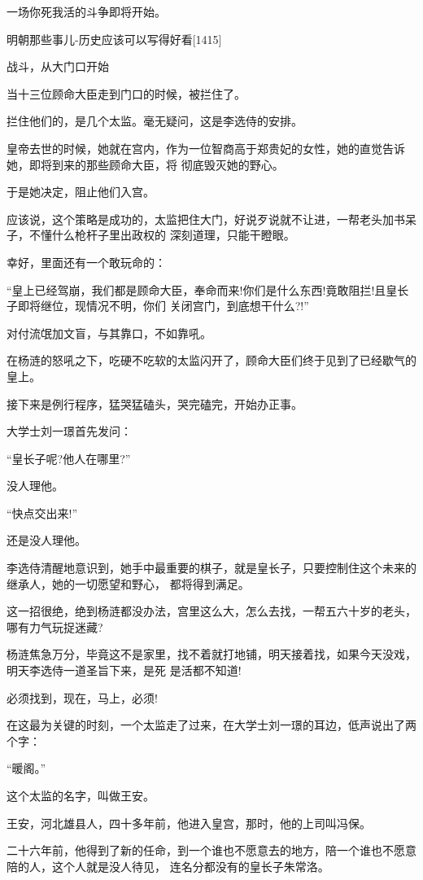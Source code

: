 \documentclass[11pt,a4paper,onecolumn]{article}
\begin{document}
一场你死我活的斗争即将开始。

明朝那些事儿-历史应该可以写得好看$[$1415$]$

战斗，从大门口开始

当十三位顾命大臣走到门口的时候，被拦住了。

拦住他们的，是几个太监。毫无疑问，这是李选侍的安排。

皇帝去世的时候，她就在宫内，作为一位智商高于郑贵妃的女性，她的直觉告诉她，即将到来的那些顾命大臣，将
彻底毁灭她的野心。

于是她决定，阻止他们入宫。

应该说，这个策略是成功的，太监把住大门，好说歹说就不让进，一帮老头加书呆子，不懂什么枪杆子里出政权的
深刻道理，只能干瞪眼。

幸好，里面还有一个敢玩命的：

``皇上已经驾崩，我们都是顾命大臣，奉命而来!你们是什么东西!竟敢阻拦!且皇长子即将继位，现情况不明，你们
关闭宫门，到底想干什么?!''

对付流氓加文盲，与其靠口，不如靠吼。

在杨涟的怒吼之下，吃硬不吃软的太监闪开了，顾命大臣们终于见到了已经歇气的皇上。

接下来是例行程序，猛哭猛磕头，哭完磕完，开始办正事。

大学士刘一璟首先发问：

``皇长子呢?他人在哪里?''

没人理他。

``快点交出来!''

还是没人理他。

李选侍清醒地意识到，她手中最重要的棋子，就是皇长子，只要控制住这个未来的继承人，她的一切愿望和野心，
都将得到满足。

这一招很绝，绝到杨涟都没办法，宫里这么大，怎么去找，一帮五六十岁的老头，哪有力气玩捉迷藏?

杨涟焦急万分，毕竟这不是家里，找不着就打地铺，明天接着找，如果今天没戏，明天李选侍一道圣旨下来，是死
是活都不知道!

必须找到，现在，马上，必须!

在这最为关键的时刻，一个太监走了过来，在大学士刘一璟的耳边，低声说出了两个字：

``暖阁。''

这个太监的名字，叫做王安。

王安，河北雄县人，四十多年前，他进入皇宫，那时，他的上司叫冯保。

二十六年前，他得到了新的任命，到一个谁也不愿意去的地方，陪一个谁也不愿意陪的人，这个人就是没人待见，
连名分都没有的皇长子朱常洛。
\end{document}
